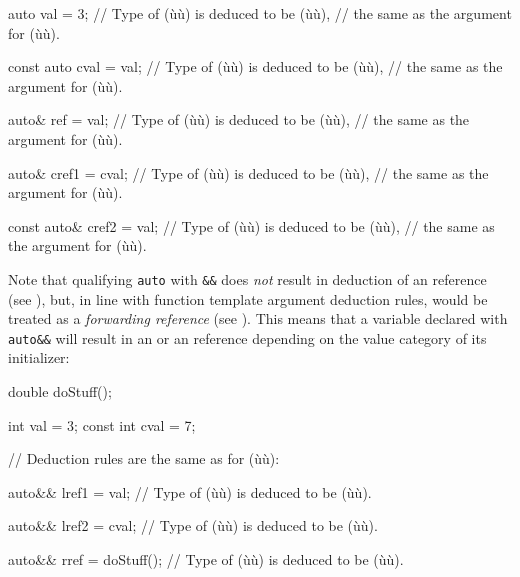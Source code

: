 \begin{emcppslisting}
auto val = 3;
    // Type of (ù{}ù) is deduced to be (ù{}ù),
    // the same as the argument for (ù{}ù).

const auto cval = val;
    // Type of (ù{}ù) is deduced to be (ù{}ù),
    // the same as the argument for (ù{}ù).

auto& ref = val;
    // Type of (ù{}ù) is deduced to be (ù{}ù),
    // the same as the argument for (ù{}ù).

auto& cref1 = cval;
    // Type of (ù{}ù) is deduced to be (ù{}ù),
    // the same as the argument for (ù{}ù).

const auto& cref2 = val;
    // Type of (ù{}ù) is deduced to be (ù{}ù),
    // the same as the argument for (ù{}ù).
\end{emcppslisting}
    
\noindent Note that qualifying \lstinline!auto! with \lstinline!&&!
does \emph{not} result in deduction of an  reference (see
), but, in line with function template
argument deduction rules, would be treated as a \emph{forwarding
reference} (see ). This means that a
variable declared with \lstinline!auto&&! will result in an  or an
 reference depending on the value category of its initializer:

\begin{emcppslisting}[emcppsbatch={e1,e2}]
double doStuff();

      int val  = 3;
const int cval = 7;

// Deduction rules are the same as for (ù{}ù):

auto&& lref1 = val;
    // Type of (ù{}ù) is deduced to be (ù{}ù).

auto&& lref2 = cval;
    // Type of (ù{}ù) is deduced to be (ù{}ù).

auto&& rref = doStuff();
    // Type of (ù{}ù) is deduced to be (ù{}ù).
\end{emcppslisting}
    
